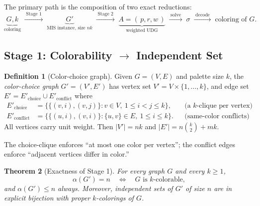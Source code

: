 \documentclass[11pt]{article}
\newtheorem{theorem}{Theorem}[section]
\theoremstyle{definition}
\newtheorem{definition}[theorem]{Definition}
\theoremstyle{remark}
\newcommand{\indep}{\alpha}
\begin{document}
The primary path is the composition of two exact reductions:
\[
  \underbrace{G,k}_{\text{coloring}}
  \;\xrightarrow{\;\text{Stage 1}\;}\;
  \underbrace{G'}_{\text{MIS instance, size }nk}
  \;\xrightarrow{\;\text{Stage 2}\;}\;
  \underbrace{A=(\,p,r,w\,)}_{\text{weighted UDG}}
  \;\xrightarrow{\;\text{solve}\;}\;
  \sigma
  \;\xrightarrow{\;\text{decode}\;}\;
  \text{coloring of }G.
\]

\subsection{Stage 1: Colorability $\to$ Independent Set}
\label{sec:col2is}

\begin{definition}[Color-choice graph]
\label{def:choice}
Given $G=(V,E)$ and palette size $k$, the \emph{color-choice graph} $G'=(V',E')$ has
vertex set $V'=V\times\{1,\dots,k\}$, and edge set
$E'=E'_{\mathrm{choice}}\cup E'_{\mathrm{conflict}}$ where
\begin{align*}
  E'_{\mathrm{choice}}   &= \bigl\{\{(v,i),(v,j)\} : v\in V,\ 1\le i<j\le k\bigr\},
   &&\text{(a $k$-clique per vertex)}\\
  E'_{\mathrm{conflict}} &= \bigl\{\{(u,i),(v,i)\} : \{u,v\}\in E,\ 1\le i\le k\bigr\}.
   &&\text{(same-color conflicts)}
\end{align*}
All vertices carry unit weight. Then $|V'|=nk$ and $|E'|=n\binom{k}{2}+mk$.
\end{definition}

The choice-clique enforces ``at most one color per vertex''; the conflict edges
enforce ``adjacent vertices differ in color.''

\begin{theorem}[Exactness of Stage 1]
\label{thm:col2is}
For every graph $G$ and every $k\ge 1$,
\[
  \indep(G') = n \quad\Longleftrightarrow\quad G \text{ is } k\text{-colorable},
\]
and $\indep(G')\le n$ always. Moreover, independent sets of $G'$ of size $n$ are in
explicit bijection with proper $k$-colorings of $G$.
\end{theorem}
\end{document}
